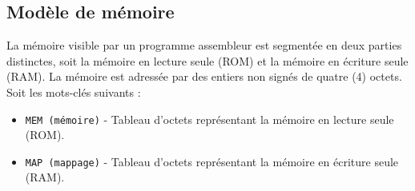 \subsection*{Modèle de mémoire}
\noindent
La mémoire visible par un programme assembleur est segmentée en deux 
parties distinctes, soit la mémoire en lecture seule (ROM) et la 
mémoire en écriture seule (RAM). La mémoire est adressée par des 
entiers non signés de quatre (4) octets. Soit les mots-clés suivants :
\begin{itemize}
  \item \texttt{MEM (mémoire)} - Tableau d'octets représentant la 
    mémoire en lecture seule (ROM).
  \item \texttt{MAP (mappage)} - Tableau d'octets représentant la 
    mémoire en écriture seule (RAM).
\end{itemize}

